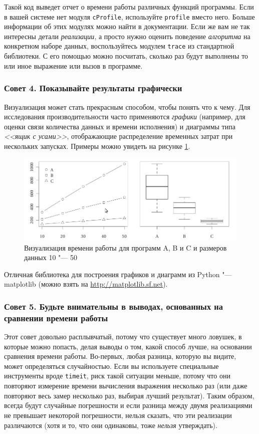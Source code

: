 Такой код выведет отчет о времени работы различных функций программы. Если в вашей системе нет модуля \texttt{cProfile}, используйте \texttt{profile} вместо него. Больше информации об этих модулях можно найти в документации. Если же вам не так интересны детали \textit{реализации}, а просто нужно оценить поведение \textit{алгоритма} на конкретном наборе данных, воспользуйтесь модулем \texttt{trace} из стандартной библиотеки. С его помощью можно посчитать, сколько раз будут выполнены то или иное выражение или вызов в программе.

\subsubsection*{Совет 4. Показывайте результаты графически}

Визуализация может стать прекрасным способом, чтобы понять что к чему. Для исследования производительности часто применяются \textit{графики} (например, для оценки связи количества данных и времени исполнения) и диаграммы типа \textit{<<ящик с усами>>}, отображающие распределение временных затрат при нескольких запусках. Примеры можно увидеть на рисунке \ref{fig:evaluation-diagrams}.

\begin{figure}[h]
	\centering
	\includegraphics[width=\textwidth]{img/2-2.png}
	\caption{Визуализация времени работы для программ A, B и C и размеров данных 10 "--- 50}
	\label{fig:evaluation-diagrams}
\end{figure}

Отличная библиотека для построения графиков и диаграмм из Python "--- matplotlib (можно взять на \url{http://matplotlib.sf.net}).

\subsubsection*{Совет 5. Будьте внимательны в выводах, основанных на сравнении времени работы}

Этот совет довольно расплывчатый, потому что существует много ловушек, в которые можно попасть, делая выводы о том, какой способ лучше, на основании сравнения времени работы. Во-первых, любая разница, которую вы видите, может определяться случайностью. Если вы используете специальные инструменты вроде \texttt{timeit}, риск такой ситуации меньше, потому что они повторяют измерение времени вычисления выражения несколько раз (или даже повторяют весь замер несколько раз, выбирая лучший результат). Таким образом, всегда будут случайные погрешности и если разница между двумя реализациями не превышает некоторой погрешности, нельзя сказать, что эти реализации различаются (хотя и то, что они одинаковы, тоже \textit{нельзя} утверждать).

